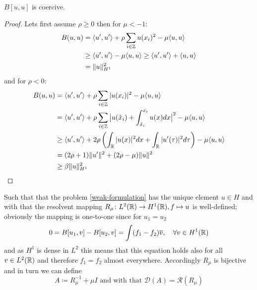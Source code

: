 \begin{theorem} \label{1.2}
	$B[u, u]$ is coercive.
	\begin{proof}
		Lets first assume $\rho \geq 0$ then for $\mu < -1$:
		\begin{align*}
			B(u, u) & = \langle u' , u' \rangle + \rho \sum_{i \in \mathbb{Z}} u(x_{i})^{2} - \mu \langle u , u \rangle \\
					& \geq \langle u' , u' \rangle - \mu \langle u , u \rangle \geq \langle u' , u' \rangle  + \langle u , u \rangle \\
					& = \| u \|_{H^{1}}^{2}
		\end{align*}
		and for $\rho < 0$:
		\begin{align*}
			B(u, u) & = \langle u' , u' \rangle + \rho \sum_{i \in \mathbb{Z}} |u(x_{i})|^{2} - \mu 	\langle u , u \rangle \\
					& = \langle u' , u' \rangle + \rho \sum_{i \in \mathbb{Z}} \big| u(\tilde{x}_{i}) + \int_{\tilde{x}_{i}}^{x_{i}} u(x) dx \big|^{2} - \mu \langle u , u \rangle \\
					& \geq \langle u' , u' \rangle + 2 \rho \left( \int_{\mathbb{R}} |u(x)|^{2} dx + \int_{\mathbb{R}} |u'(\tau)|^{2} d\tau \right) - \mu \langle u , u \rangle \\
					& = (2 \rho + 1) \| u' \|^{2} + (2\rho - \mu) \| u \|^{2}  \\
					& \geq \beta \| u \|_{H^{1}}^{2} 
		\end{align*}
	\end{proof}
\end{theorem}
Such that that the problem \eqref{weak-formulation} has the unique element $u \in H$ and with that the resolvent mapping $R_{\mu} \colon L^{2}(\mathbb{R}) \rightarrow H^{1}(\mathbb{R}), f \mapsto u$ is well-defined; obviously the mapping is one-to-one since for $u_{1} = u_{2}$
	\[ 0 = B[u_{1}, v] - B[u_{2}, v]= \int (f_{1} - f_{2}) \overline{v}, \quad \forall v \in H^{1}(\mathbb{R}) \]
and as $H^{1}$ is dense in $L^{2}$ this means that this equation holds also for all $v \in L^{2}(\mathbb{R})$ and therefore $f_{1} = f_{2}$ almost everywhere. Accordingly $R_{\mu}$ is bijective and in turn we can define 
		\[ A \coloneqq R_{\mu}^{-1} + \mu I \text{ and with that } \mathcal{D}(A) = \mathcal{R}(R_{\mu}) \]